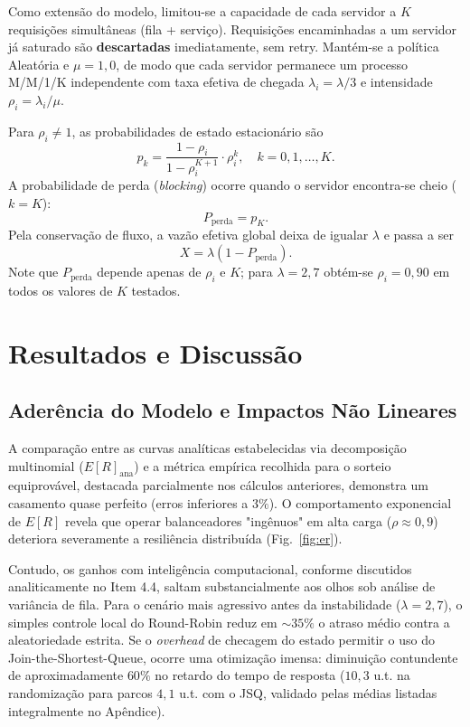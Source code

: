 \documentclass[conference]{IEEEtran}
\begin{document}
Como extensão do modelo, limitou-se a capacidade de cada servidor a $K$ requisições simultâneas (fila + serviço). Requisições encaminhadas a um servidor já saturado são \textbf{descartadas} imediatamente, sem retry. Mantém-se a política Aleatória e $\mu = 1{,}0$, de modo que cada servidor permanece um processo M/M/1/K independente com taxa efetiva de chegada $\lambda_i = \lambda/3$ e intensidade $\rho_i = \lambda_i/\mu$.

Para $\rho_i \neq 1$, as probabilidades de estado estacionário são
\begin{equation}
p_k = \frac{1-\rho_i}{1-\rho_i^{K+1}} \cdot \rho_i^{k}, \quad k = 0, 1, \ldots, K.
\end{equation}
A probabilidade de perda (\textit{blocking}) ocorre quando o servidor encontra-se cheio ($k = K$):
\begin{equation}
P_{\text{perda}} = p_K.
\end{equation}
Pela conservação de fluxo, a vazão efetiva global deixa de igualar $\lambda$ e passa a ser
\begin{equation}
X = \lambda \left(1 - P_{\text{perda}}\right).
\end{equation}
Note que $P_{\text{perda}}$ depende apenas de $\rho_i$ e $K$; para $\lambda = 2{,}7$ obtém-se $\rho_i = 0{,}90$ em todos os valores de $K$ testados.

\section{Resultados e Discussão}

\subsection{Aderência do Modelo e Impactos Não Lineares}

A comparação entre as curvas analíticas estabelecidas via decomposição multinomial ($E[R]_{\text{ana}}$) e a métrica empírica recolhida para o sorteio equiprovável, destacada parcialmente nos cálculos anteriores, demonstra um casamento quase perfeito (erros inferiores a $3\%$). O comportamento exponencial de $E[R]$ revela que operar balanceadores "ingênuos" em alta carga ($\rho \approx 0{,}9$) deteriora severamente a resiliência distribuída (Fig.~\ref{fig:er}). 

Contudo, os ganhos com inteligência computacional, conforme discutidos analiticamente no Item 4.4, saltam substancialmente aos olhos sob análise de variância de fila. Para o cenário mais agressivo antes da instabilidade ($\lambda=2{,}7$), o simples controle local do Round-Robin reduz em $\sim 35\%$ o atraso médio contra a aleatoriedade estrita. Se o \textit{overhead} de checagem do estado permitir o uso do Join-the-Shortest-Queue, ocorre uma otimização imensa: diminuição contundente de aproximadamente $60\%$ no retardo do tempo de resposta ($10{,}3$ u.t. na randomização para parcos $4{,}1$ u.t. com o JSQ, validado pelas médias listadas integralmente no Apêndice).
\end{document}
